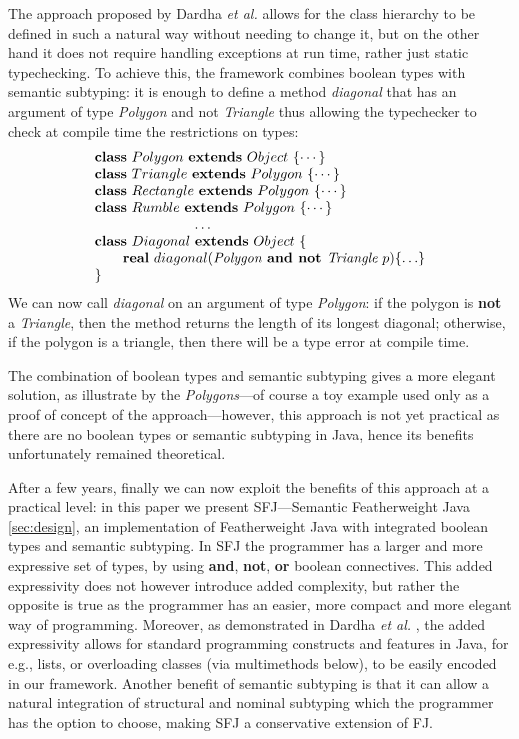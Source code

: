 \documentclass[runningheads]{llncs}
\begin{document}
\begin{example}
The approach proposed by Dardha \emph{et al.} \cite{Dardha2013,Dardha2017} allows for the class hierarchy to be defined in such a natural way without needing to change it, but on the other hand it does not require handling exceptions at run time,  rather just static typechecking.
To achieve this, the framework combines boolean types with semantic subtyping: it is enough to define a method \emph{diagonal} that has an argument of type \emph{Polygon} and not \emph{Triangle} thus allowing the typechecker to check at compile time the restrictions on types:
$$
\begin{array}{l}
\mathbf{class} \  Polygon \ \mathbf{extends }\  Object\ \{\cdots\}
\\
\mathbf{class} \  Triangle \ \mathbf{extends }\  Polygon\ \{\cdots\}
\\
\mathbf{class} \  Rectangle \ \mathbf{extends }\  Polygon\ \{\cdots\}
\\
\mathbf{class} \  Rumble \ \mathbf{extends }\  Polygon\ \{\cdots\}
\\
\hspace{2.5cm} \ldots
\\
\mathbf{class} \  Diagonal \ \mathbf{extends }\  Object\ \{
	\\
	\qquad \mathbf{real}\ diagonal(\textit{Polygon} \textbf{ and not }  \textit{Triangle} \ p)\{\ldots\}
	\\
\}
\end{array}
$$
We can now call \emph{diagonal} on an argument of type \emph{Polygon}: if the polygon is \textbf{not} a \emph{Triangle}, then the method returns the length of its longest diagonal; otherwise, if the polygon is a triangle, then there will be a type error at compile time.
\end{example}
The combination of boolean types and semantic subtyping gives a more elegant solution, as illustrate by the \emph{Polygons}---of course a toy example used only as a proof of concept of the approach---however, this approach is not yet practical as there are no boolean types or semantic subtyping in Java, hence its benefits unfortunately remained theoretical.

After a few years, finally we can now exploit the benefits of this approach at a practical level: in this paper we present SFJ---Semantic Featherweight Java \autoref{sec:design}, an implementation of Featherweight Java with integrated boolean types and semantic subtyping.
In SFJ the programmer has a larger and more expressive set of types, by using \textbf{and}, \textbf{not}, \textbf{or} boolean connectives. This added expressivity does not however introduce added complexity, but rather the opposite is true as the programmer has an easier, more compact and more elegant way of programming. Moreover, as demonstrated in Dardha \emph{et al.} \cite[\S 8.4]{Dardha2017}, the added expressivity allows for standard programming constructs and features in Java, for e.g., lists, or overloading classes (via multimethods below), to be easily encoded in our framework. Another benefit of semantic subtyping is that it can allow a natural integration of structural and nominal subtyping which the programmer has the option to choose, making SFJ a conservative extension of FJ.
\end{document}
